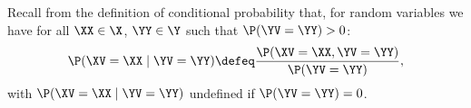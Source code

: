 \begin{definition}
  Recall from the definition of conditional probability that,
  for random variables 
  we have for all $\XX \in \X$, $\YY \in \Y$ such that $\P(\YV = \YY) > 0$:
  $$\P(\XV = \XX \mid \YV = \YY) \defeq \frac{\P(\XV = \XX, \YV = \YY)}{\P(\YV = \YY)},$$%
  with $\P(\XV = \XX \mid \YV = \YY)$ undefined if $\P(\YV = \YY) = 0$.
\end{definition}
